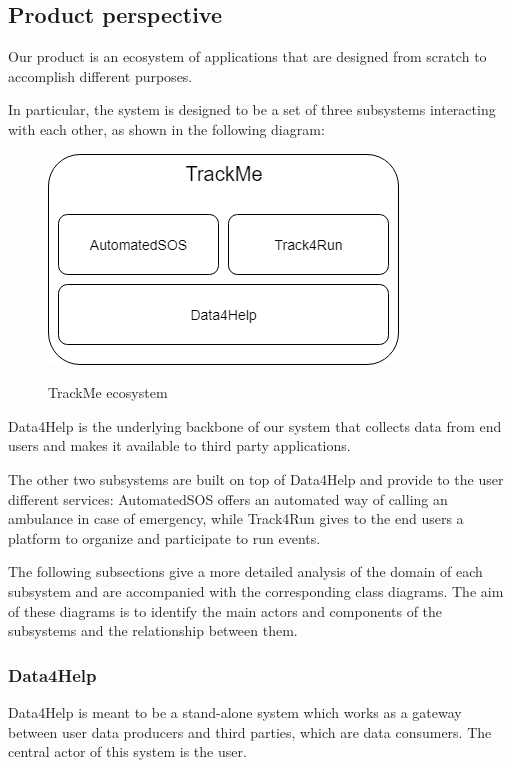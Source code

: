 \subsection{Product perspective}
Our product is an ecosystem of applications that are designed from scratch to accomplish different purposes.

In particular, the system is designed to be a set of three subsystems interacting with each other, as shown in the following diagram:

\begin{figure}[!ht]
	\centering
	\includegraphics[scale = 0.70]{Images/general_structure.png}\\[1.0 cm]
	\caption{TrackMe ecosystem}
\end{figure}

Data4Help is the underlying backbone of our system that collects data from end users and makes it available to third party applications. 

The other two subsystems are built on top of Data4Help and provide to the user different services: AutomatedSOS offers an automated way of calling an ambulance in case of emergency, while Track4Run gives to the end users a platform to organize and participate to run events.

The following subsections give a more detailed analysis of the domain of each subsystem and are accompanied with the corresponding class diagrams. The aim of these diagrams is to identify the main actors and components of the subsystems and the relationship between them.

 \newpage
\subsubsection{Data4Help}
Data4Help is meant to be a stand-alone system which works as a gateway between user data producers and third parties, which are data consumers. The central actor of this system is the user.

